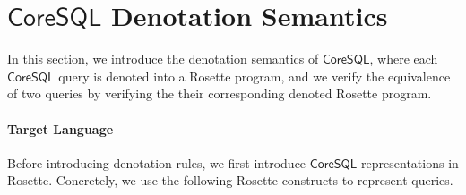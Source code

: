 
\section{$\mathsf{CoreSQL}$ Denotation Semantics}

In this section, we introduce the denotation semantics of $\mathsf{CoreSQL}$, where each $\mathsf{CoreSQL}$ query is denoted into a Rosette program, and we verify the equivalence of two queries by verifying the their corresponding denoted Rosette program. 

\paragraph{Target Language} 

Before introducing denotation rules, we first introduce $\mathsf{CoreSQL}$ representations in Rosette. Concretely, we use the following Rosette constructs to represent queries.
